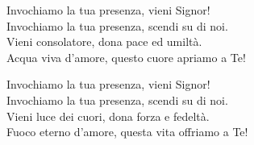 
\strofa Invochiamo la tua presenza, vieni Signor!\\
Invochiamo la tua presenza, scendi su di noi.\\
Vieni consolatore, dona pace ed umiltà.\\
Acqua viva d'amore, questo cuore apriamo a Te!

\spazio


\spazio

\strofa Invochiamo la tua presenza, vieni Signor!\\
Invochiamo la tua presenza, scendi su di noi.\\
Vieni luce dei cuori, dona forza e fedeltà.\\
Fuoco eterno d'amore, questa vita offriamo a Te!

\spazio

